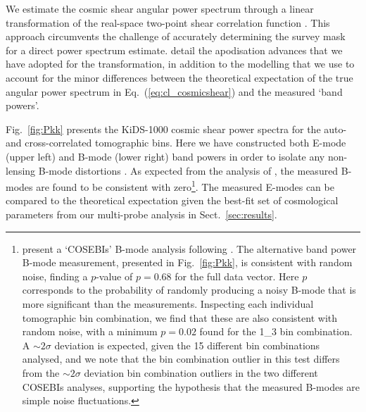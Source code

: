 We estimate the cosmic shear angular power spectrum through a linear transformation of the real-space two-point shear correlation function \citep{schneider/etal:2002}.  This approach circumvents the challenge of accurately determining the survey mask for a direct power spectrum estimate.  \citet{joachimi/etal:inprep} detail the apodisation advances that we have adopted for the transformation, in addition to the modelling that we use to account for the minor differences between the theoretical expectation of the true angular power spectrum in Eq.~(\ref{eq:cl_cosmicshear}) and the measured `band powers'.    
 
Fig.~\ref{fig:Pkk} presents the \citet{asgari/etal:inprep} KiDS-1000 cosmic shear power spectra for the auto- and cross-correlated tomographic bins.   Here we have constructed both E-mode (upper left) and B-mode (lower right) band powers in order to isolate any non-lensing B-mode distortions \citep[see equations 17 to 21 of][]{joachimi/etal:inprep}.     As expected from the analysis of \citet{giblin/etal:inprep}, the measured B-modes are found to be consistent with zero\footnote{\citet{giblin/etal:inprep} present a `COSEBIs' B-mode analysis following \citet{asgari/etal:2019}.  The alternative band power B-mode measurement, presented in Fig.~\ref{fig:Pkk}, is consistent with random noise, finding a $p$-value of $p=0.68$ for the full data vector.  Here $p$ corresponds to the probability of randomly producing a noisy B-mode that is more significant than the measurements.  Inspecting each individual tomographic bin combination, we find that these are also consistent with random noise, with a minimum $p=0.02$ found for the 1{\_}3 bin combination.   A $\sim 2\sigma$ deviation is expected, given the 15 different bin combinations analysed, and we note that the bin combination outlier in this test differs from the $\sim 2\sigma$ deviation bin combination outliers in the two different COSEBIs analyses, supporting the hypothesis that the measured B-modes are simple noise fluctuations.}.   The measured E-modes can be compared to the theoretical expectation given the best-fit set of cosmological parameters from our multi-probe analysis in Sect.~\ref{sec:results}.

